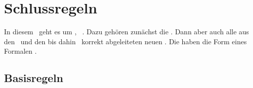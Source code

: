 \section{Schlussregeln}%
\label{sec:Schlussregeln}

In diesem \sectionname\ geht es um , \textdh\ .
Dazu gehören zunächst die \Basisregeln.
Dann aber auch alle aus den \Basisregeln\ und den bis dahin \allgemeingueltigenSchlussregeln\ korrekt abgeleiteten neuen .
Die  haben die Form eines Formalen \Satzes.

\subsection{Basisregeln}%
\label{sub:Basisregeln}
\hidden{\Basisregeln}

